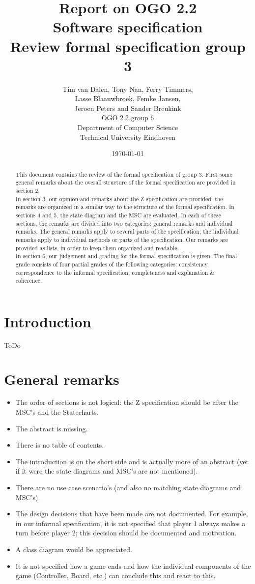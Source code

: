\documentclass[a4paper,11pt]{article}
\title{Report on OGO 2.2 \\ Software specification\\ Review formal specification group 3}
\author{
        Tim van Dalen, Tony Nan, Ferry Timmers, \\ Lasse Blaauwbroek, Femke Jansen, \\Jeroen Peters and Sander Breukink\\ OGO 2.2 group 6 \\
                Department of Computer Science\\
        Technical University Eindhoven\\
}
\date{\today}
\begin{document}
\maketitle

\begin{abstract}
This document contains the review of the formal specification of group 3. First some general remarks about the overall structure of the formal specification are provided in section 2. \\
In section 3, our opinion and remarks about the Z-specification are provided; the remarks are organized in a similar way to the structure of the formal specification. In sections 4 and 5, the state diagram and the MSC are evaluated. In each of these sections, the remarks are divided into two categories: general remarks and individual remarks. The general remarks apply to several parts of the specification; the individual remarks apply to individual methods or parts of the specification. Our remarks are provided as lists, in order to keep them organized and readable. \\
In section 6, our judgement and grading for the formal specification is given. The final grade consists of four partial grades of the following categories: consistency, correspondence to the informal specification, completeness and explanation \& coherence.
\end{abstract}

\newpage
	
	\tableofcontents
	\newpage

    \section{Introduction}
    ToDo	

	\section{General remarks}
    \begin{itemize}
        \item The order of sections is not logical: the Z specification should be after the MSC's and the Statecharts.
        \item The abstract is missing.
        \item There is no table of contents.
        \item The introduction is on the short side and is actually more of an abstract (yet if it were the state diagrams and MSC's are not mentioned).
        \item There are no use case scenario's (and also no matching state diagrams and MSC's).
        \item The design decisions that have been made are not documented. For example, in our informal specification, it is not specified that player 1 always makes a turn before player 2; this decision should be documented and motivation.
        \item A class diagram would be appreciated.
        \item It is not specified how a game ends and how the individual components of the game (Controller, Board, etc.) can conclude this and react to this.
    \end{itemize}
	
\end{document}

